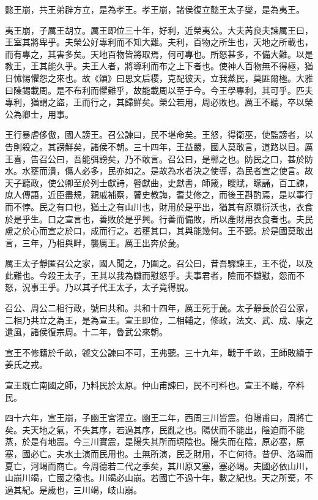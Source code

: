 懿王崩，共王弟辟方立，是為孝王。孝王崩，諸侯復立懿王太子燮，是為夷王。

夷王崩，子厲王胡立。厲王即位三十年，好利，近榮夷公。大夫芮良夫諫厲王曰，王室其將卑乎。夫榮公好專利而不知大難。夫利，百物之所生也，天地之所載也，而有專之，其害多矣。天地百物皆將取焉，何可專也。所怒甚多，不備大難。以是教王，王其能久乎。夫王人者，將導利而布之上下者也。使神人百物無不得極，猶日怵惕懼怨之來也。故《頌》曰思文后稷，克配彼天，立我蒸民，莫匪爾極。大雅曰陳錫載周。是不布利而懼難乎，故能載周以至于今。今王學專利，其可乎。匹夫專利，猶謂之盜，王而行之，其歸鮮矣。榮公若用，周必敗也。厲王不聽，卒以榮公為卿士，用事。

王行暴虐侈傲，國人謗王。召公諫曰，民不堪命矣。王怒，得衛巫，使監謗者，以告則殺之。其謗鮮矣，諸侯不朝。三十四年，王益嚴，國人莫敢言，道路以目。厲王喜，告召公曰，吾能弭謗矣，乃不敢言。召公曰，是鄣之也。防民之口，甚於防水。水壅而潰，傷人必多，民亦如之。是故為水者決之使導，為民者宣之使言。故天子聽政，使公卿至於列士獻詩，瞽獻曲，史獻書，師箴，瞍賦，矇誦，百工諫，庶人傳語，近臣盡規，親戚補察，瞽史教誨，耆艾修之，而後王斟酌焉，是以事行而不悖。民之有口也，猶土之有山川也，財用於是乎出，猶其有原隰衍沃也，衣食於是乎生。口之宣言也，善敗於是乎興。行善而備敗，所以產財用衣食者也。夫民慮之於心而宣之於口，成而行之。若壅其口，其與能幾何。王不聽。於是國莫敢出言，三年，乃相與畔，襲厲王。厲王出奔於彘。

厲王太子靜匿召公之家，國人聞之，乃圍之。召公曰，昔吾驟諫王，王不從，以及此難也。今殺王太子，王其以我為讎而懟怒乎。夫事君者，險而不讎懟，怨而不怒，況事王乎。乃以其子代王太子，太子竟得脫。

召公、周公二相行政，號曰共和。共和十四年，厲王死于彘。太子靜長於召公家，二相乃共立之為王，是為宣王。宣王即位，二相輔之，修政，法文、武、成、康之遺風，諸侯復宗周。十二年，魯武公來朝。

宣王不修籍於千畝，虢文公諫曰不可，王弗聽。三十九年，戰于千畝，王師敗績于姜氏之戎。

宣王既亡南國之師，乃料民於太原。仲山甫諫曰，民不可料也。宣王不聽，卒料民。

四十六年，宣王崩，子幽王宮湦立。幽王二年，西周三川皆震。伯陽甫曰，周將亡矣。夫天地之氣，不失其序，若過其序，民亂之也。陽伏而不能出，陰迫而不能蒸，於是有地震。今三川實震，是陽失其所而填陰也。陽失而在陰，原必塞，原塞，國必亡。夫水土演而民用也。土無所演，民乏財用，不亡何待。昔伊、洛竭而夏亡，河竭而商亡。今周德若二代之季矣，其川原又塞，塞必竭。夫國必依山川，山崩川竭，亡國之徵也。川竭必山崩。若國亡不過十年，數之紀也。天之所棄，不過其紀。是歲也，三川竭，岐山崩。


